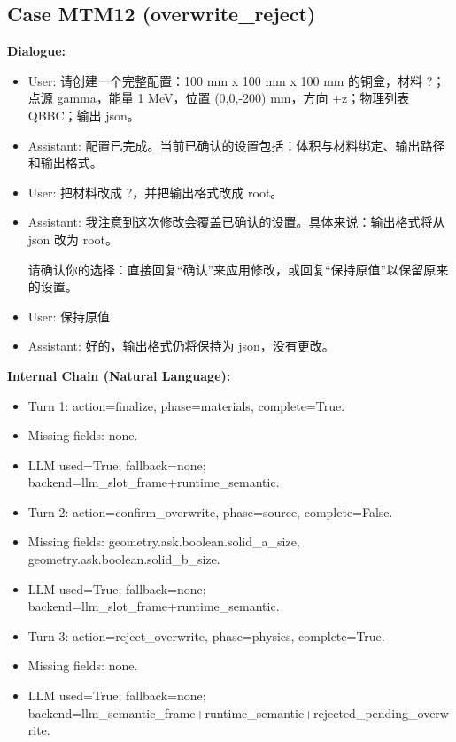 \documentclass[11pt]{ctexart}
\begin{document}
\subsection{Case MTM12 (overwrite\_reject)}
\textbf{Dialogue:}
\begin{itemize}
\item User: 请创建一个完整配置：100 mm x 100 mm x 100 mm 的铜盒，材料 ?；点源 gamma，能量 1 MeV，位置 (0,0,-200) mm，方向 +z；物理列表 QBBC；输出 json。
\item Assistant: 配置已完成。当前已确认的设置包括：体积与材料绑定、输出路径和输出格式。
\item User: 把材料改成 ?，并把输出格式改成 root。
\item Assistant: 我注意到这次修改会覆盖已确认的设置。具体来说：输出格式将从 json 改为 root。

请确认你的选择：直接回复“确认”来应用修改，或回复“保持原值”以保留原来的设置。
\item User: 保持原值
\item Assistant: 好的，输出格式仍将保持为 json，没有更改。
\end{itemize}
\textbf{Internal Chain (Natural Language):}
\begin{itemize}
\item Turn 1: action=finalize, phase=materials, complete=True.
\item Missing fields: none.
\item LLM used=True; fallback=none; backend=llm\_slot\_frame+runtime\_semantic.
\item Turn 2: action=confirm\_overwrite, phase=source, complete=False.
\item Missing fields: geometry.ask.boolean.solid\_a\_size, geometry.ask.boolean.solid\_b\_size.
\item LLM used=True; fallback=none; backend=llm\_slot\_frame+runtime\_semantic.
\item Turn 3: action=reject\_overwrite, phase=physics, complete=True.
\item Missing fields: none.
\item LLM used=True; fallback=none; backend=llm\_semantic\_frame+runtime\_semantic+rejected\_pending\_overwrite.
\end{itemize}
\end{document}
